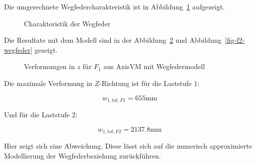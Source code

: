 \documentclass[
  11pt,
  letterpaper,
]{scrreprt}
\begin{document}
Die umgerechnete Wegfedercharakteristik ist in
Abbildung~\ref{fig-wegfeder-force} aufgezeigt.

\begin{figure}[H]


\caption{\label{fig-wegfeder-force}Charakteristik der Wegfeder}

\end{figure}%

Die Resultate mit dem Modell sind in der Abbildung~\ref{fig-f1-wegfeder}
und Abbildung~\ref{fig-f2-wegfeder} gezeigt.

\begin{figure}[H]


\caption{\label{fig-f1-wegfeder}Verformungen in \(z\) für \(F_1\) aus
AxisVM mit Wegfedermodell}

\end{figure}%

Die maximale Verformung in \(Z\)-Richtung ist für die Laststufe \(1\):

\[
w_{1,tot,F1} = 655 \text{mm}
\]

Und für die Laststufe \(2\):

\[
w_{1,tot,F2} = 2137.8 \text{mm}
\]

Hier zeigt sich eine Abweichung. Diese lässt sich auf die numerisch
approximierte Modellierung der Wegfederbeziehung zurückführen.
\end{document}
